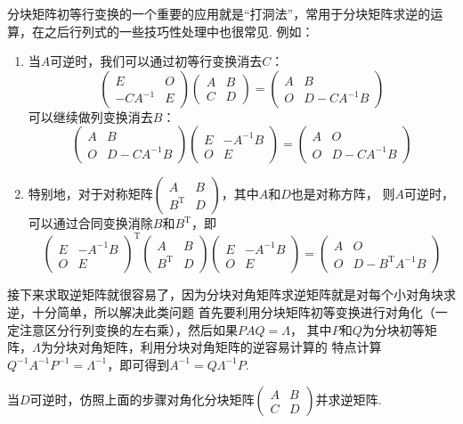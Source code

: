 分块矩阵初等行变换的一个重要的应用就是“打洞法”，常用于分块矩阵求逆的运算，在之后行列式的一些技巧性处理中也很常见.
例如：
\begin{enumerate}
	\item 当$A$可逆时，我们可以通过初等行变换消去$C$：
	$$\begin{pmatrix}
		E & O \\ -CA^{-1} & E
	\end{pmatrix}\begin{pmatrix}
		A & B \\ C & D
	\end{pmatrix}=\begin{pmatrix}
		A & B \\ O & D-CA^{-1}B
	\end{pmatrix}$$
	可以继续做列变换消去$B$：
	$$\begin{pmatrix}
		A & B \\ O & D-CA^{-1}B
	\end{pmatrix}\begin{pmatrix}
		E & -A^{-1}B \\ O & E
	\end{pmatrix}=\begin{pmatrix}
		A & O \\ O & D-CA^{-1}B
	\end{pmatrix}$$
	\item 特别地，对于对称矩阵$\begin{pmatrix}A & B \\ B^\mathrm{T} & D\end{pmatrix}$，其中$A$和$D$也是对称方阵，
	则$A$可逆时，可以通过合同变换消除$B$和$B^\mathrm{T}$，即
	$$\begin{pmatrix}
		E & -A^{-1}B \\ O & E
	\end{pmatrix}^\mathrm{T}\begin{pmatrix}
		A & B \\ B^\mathrm{T} & D
	\end{pmatrix}\begin{pmatrix}
		E & -A^{-1}B \\ O & E
	\end{pmatrix}=\begin{pmatrix}
		A & O \\ O & D-B^\mathrm{T}A^{-1}B
	\end{pmatrix}$$
\end{enumerate}
接下来求取逆矩阵就很容易了，因为分块对角矩阵求逆矩阵就是对每个小对角块求逆，十分简单，所以解决此类问题
首先要利用分块矩阵初等变换进行对角化（一定注意区分行列变换的左右乘），然后如果$PAQ=\Lambda$，
其中$P$和$Q$为分块初等矩阵，$\Lambda$为分块对角矩阵，利用分块对角矩阵的逆容易计算的
特点计算$Q^{-1}A^{-1}P^{-1}=\Lambda^{-1}$，即可得到$A^{-1}=Q\Lambda^{-1}P$.
\begin{example}
	当$D$可逆时，仿照上面的步骤对角化分块矩阵$\begin{pmatrix}A & B \\ C & D\end{pmatrix}$并求逆矩阵.
\end{example}

